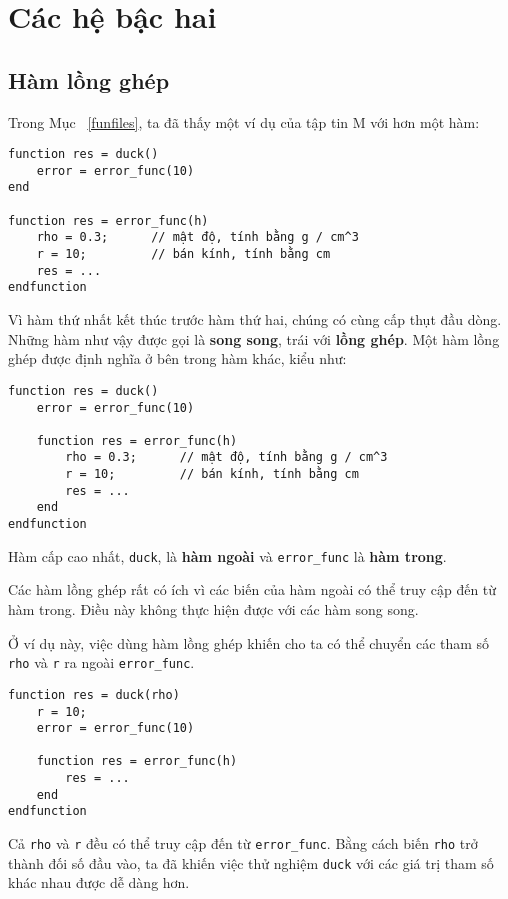 \documentclass[12pt]{book}
\begin{document}
\chapter{Các hệ bậc hai}


\section{Hàm lồng ghép}

Trong Mục~ \ref{funfiles}, ta đã thấy một ví dụ của tập tin M với
hơn một hàm:

\begin{verbatim}
function res = duck()
    error = error_func(10)
end

function res = error_func(h)
    rho = 0.3;      // mật độ, tính bằng g / cm^3
    r = 10;         // bán kính, tính bằng cm
    res = ...
endfunction
\end{verbatim}
%
Vì hàm thứ nhất kết thúc trước hàm thứ hai, chúng có cùng cấp
thụt đầu dòng. Những hàm như vậy được gọi là 
{\bf song song}, trái với {\bf lồng ghép}. Một hàm lồng ghép
được định nghĩa ở bên trong hàm khác, kiểu như:

\begin{verbatim}
function res = duck()
    error = error_func(10)

    function res = error_func(h)
        rho = 0.3;      // mật độ, tính bằng g / cm^3
        r = 10;         // bán kính, tính bằng cm
        res = ...
    end
endfunction
\end{verbatim}
%
Hàm cấp cao nhất, {\tt duck}, là 
{\bf hàm ngoài} và \verb#error_func# là
{\bf hàm trong}.

Các hàm lồng ghép rất có ích vì các biến của hàm ngoài có thể
truy cập đến từ hàm trong. Điều này không thực hiện được với
các hàm song song.

Ở ví dụ này, việc dùng hàm lồng ghép khiến cho ta có thể chuyển
các tham số {\tt rho} và {\tt r} ra ngoài \verb#error_func#.

\begin{verbatim}
function res = duck(rho)
    r = 10;
    error = error_func(10)

    function res = error_func(h)
        res = ...
    end
endfunction
\end{verbatim}
%
Cả {\tt rho} và {\tt r} đều có thể truy cập đến từ 
\verb#error_func#. Bằng cách biến {\tt rho} trở thành đối số
đầu vào, ta đã khiến việc thử nghiệm {\tt duck} với các giá
trị tham số khác nhau được dễ dàng hơn.
\end{document}
